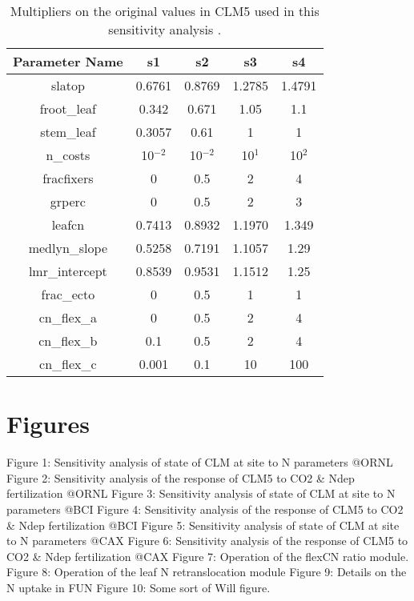 \documentclass[draft,linenumbers]{agujournal}
\begin{document}
 \begin{table}
\begin{center}
\begin{tabular}{ |c|c|c|c|c| } 
 \hline
 Parameter Name & s1 &s2 & s3 & s4\\
  \hline
 slatop & 0.6761 & 0.8769 &1.2785 &1.4791\\ 
 froot\_leaf &  0.342 &0.671 &1.05 & 1.1\\
 stem\_leaf  &  0.3057 &0.61 &1 &1\\ 
 n\_costs    & 10$^{-2}$ &10$^{-2}$&  10$^{1}$& 10$^{2}$\\
 fracfixers  & 0 &0.5 & 2 & 4 \\
  grperc  &  0 & 0.5& 2 & 3\\
  leafcn  &0.7413 & 0.8932 & 1.1970  & 1.349\\
  
     medlyn\_slope  &0.5258 & 0.7191 & 1.1057  &1.29\\
      lmr\_intercept & 0.8539 & 0.9531 & 1.1512& 1.25\\
      frac\_ecto & 0 &0.5& 1 & 1 \\
      cn\_flex\_a &0 &0.5 & 2  &4\\
      cn\_flex\_b & 0.1 & 0.5 & 2  & 4\\
      cn\_flex\_c &0.001 & 0.1 & 10 & 100\\
\hline
\end{tabular}
\end{center}
\caption{Multipliers on the original values in CLM5 used in this sensitivity analysis .}
\label{table_ranges}
\end{table}


\section{Figures}

Figure 1: Sensitivity analysis of state of CLM at site to N parameters @ORNL
Figure 2: Sensitivity analysis of the response of CLM5 to CO2 \& Ndep fertilization @ORNL
Figure 3: Sensitivity analysis of state of CLM at site to N parameters @BCI
Figure 4: Sensitivity analysis of the response of CLM5 to CO2 \& Ndep fertilization @BCI
Figure 5: Sensitivity analysis of state of CLM at site to N parameters @CAX
Figure 6: Sensitivity analysis of the response of CLM5 to CO2 \& Ndep fertilization @CAX
Figure 7: Operation of the flexCN ratio module. 
Figure 8: Operation of the leaf N retranslocation module
Figure 9: Details on the N uptake in FUN
Figure 10: Some sort of Will figure. 
\end{document}
